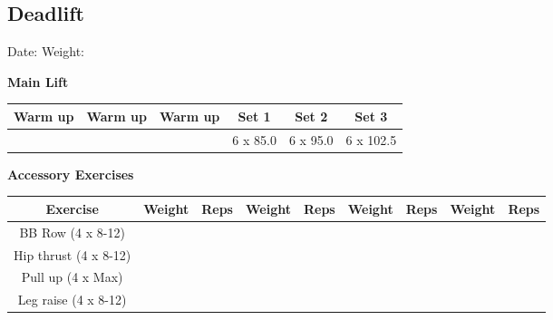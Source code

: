 \documentclass{article}%
\begin{document}
\subsection*{Deadlift}%
Date: %
\linebreak%
Weight: %
\vspace*{20pt}%
\linebreak%
\begin{minipage}{0.5\textwidth}%
\textbf{Main Lift\newline%
\newline%
}%
\begin{tabular}{|c|c|c|c|c|c|}%
\hline%
Warm up&Warm up&Warm up&Set 1&Set 2&Set 3\\%
\hline%
&&&6 x 85.0&6 x 95.0&6 x 102.5\\%
\hline%
\end{tabular}%
\vspace*{20pt}%
\linebreak%
\textbf{Accessory Exercises\newline%
\newline%
}%
\begin{tabular}{|c|c|c|c|c|c|c|c|c|}%
\hline%
Exercise&Weight&Reps&Weight&Reps&Weight&Reps&Weight&Reps\\%
\hline%
BB Row (4 x 8{-}12)&&&&&&&&\\%
\hline%
Hip thrust (4 x 8{-}12)&&&&&&&&\\%
\hline%
Pull up (4 x Max)&&&&&&&&\\%
\hline%
Leg raise (4 x 8{-}12)&&&&&&&&\\%
\hline%
\end{tabular}%
\end{minipage}%
\vspace*{20pt}%
\linebreak

%
\end{document}
